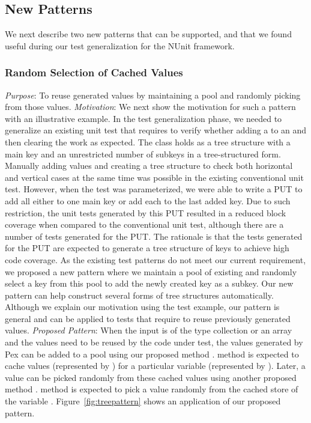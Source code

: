 \subsection{New Patterns}
\label{sec:newpatterns}

We next describe two new patterns that can be supported, and that we found useful during our test generalization for the NUnit framework. 
\subsubsection{Random Selection of Cached Values}
\emph{Purpose}: To reuse generated values by maintaining a pool and randomly picking from those values.
\newline
\emph{Motivation}: We next show the motivation for such a pattern with an illustrative example. In the test generalization phase, we needed to generalize an existing unit test 
that requires to verify whether adding a  to an  and 
then clearing the  work as expected. The  class holds  as a tree structure with a main key and an unrestricted number of subkeys in a tree-structured form. Manually adding values and creating a tree structure to check both horizontal and vertical cases at the same time was possible in the existing conventional unit test. However, when the test was parameterized, we were able to write a PUT to add all  either to one main key or add each  to the last added key. Due to such restriction, the unit tests generated by this PUT
resulted in a reduced block coverage when compared to the conventional unit test, although there are a number of tests generated for the PUT. The rationale is that the tests generated for the PUT are expected to generate
a tree structure of keys to achieve high code coverage. As the existing test 
patterns do not meet our current requirement, we proposed a new pattern
where we maintain a pool of existing  and randomly
select a key from this pool to add the newly created key as a subkey.
Our new pattern can help construct several forms of tree structures automatically.
Although we explain our motivation using the  test
example, our pattern is general and can be applied to tests that require
to reuse previously generated values.
\newline
\emph{Proposed Pattern}: When the input is of the type collection or an array and the values need to be reused by the code under test, 
the values generated by Pex can be added to a pool using our proposed method 
.  method is expected to cache values (represented by ) for a particular variable (represented by ). Later, a value can be picked randomly from these cached values using another proposed method .  method is expected to pick a value randomly from the cached store of the variable . Figure~\ref{fig:treepattern} shows an application of our proposed pattern.

